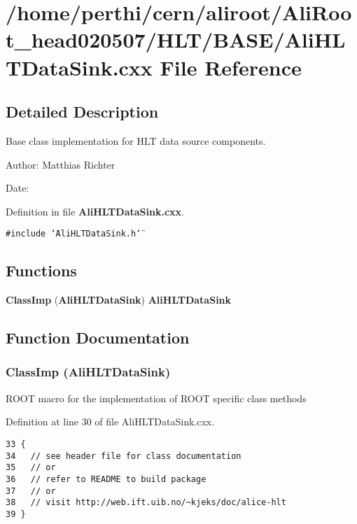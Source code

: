 \section{/home/perthi/cern/aliroot/Ali\-Root\_\-head020507/HLT/BASE/Ali\-HLTData\-Sink.cxx File Reference}
\label{AliHLTDataSink_8cxx}


\subsection{Detailed Description}
Base class implementation for HLT data source components. 

\begin{Desc}
\item[Author:]Matthias Richter \end{Desc}
\begin{Desc}
\item[Date:]\end{Desc}


Definition in file {\bf Ali\-HLTData\-Sink.cxx}.

{\tt \#include \char`\"{}Ali\-HLTData\-Sink.h\char`\"{}}\par
\subsection*{Functions}
\begin{CompactItemize}
\item 
{\bf Class\-Imp} ({\bf Ali\-HLTData\-Sink}) {\bf Ali\-HLTData\-Sink}
\end{CompactItemize}


\subsection{Function Documentation}
\subsubsection{\setlength{\rightskip}{0pt plus 5cm}Class\-Imp ({\bf Ali\-HLTData\-Sink})}\label{AliHLTDataSink_8cxx_a0}


ROOT macro for the implementation of ROOT specific class methods 

Definition at line 30 of file Ali\-HLTData\-Sink.cxx.

\footnotesize\begin{verbatim}33 { 
34   // see header file for class documentation
35   // or
36   // refer to README to build package
37   // or
38   // visit http://web.ift.uib.no/~kjeks/doc/alice-hlt
39 }
\end{verbatim}\normalsize 



